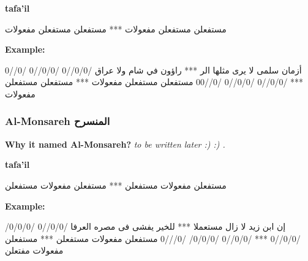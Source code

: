 \textbf{tafa'il}

\begin{Arabic}
  \begin{traditionalpoem*}

مستفعلن مستفعلن مفعولات *** مستفعلن مستفعلن مفعولات 
    
	\end{traditionalpoem*}
      \end{Arabic}


\textbf{Example:}

\begin{Arabic}
  \begin{traditionalpoem*}


    أزمان سلمى لا يرى مثلها الر *** راؤون في شام ولا عراق
/0/0//0 /0/0//0 /0//0 *** /0/0//0 /0/0//0 /0//00
مستفعلن مستفعلن مفعولات *** مستفعلن مستفعلن مفعولات 
        

          
	\end{traditionalpoem*}
      \end{Arabic}


      
      

\subsubsection{Al-Monsareh \textarabic{المنسرح}}
\textbf{Why it named Al-Monsareh?}
\textit{to be written later :) :) .}

\textbf{tafa'il}

\begin{Arabic}
  \begin{traditionalpoem*}

مستفعلن مفعولات مستفعلن *** مستفعلن مفعولات مستفعلن
    
	\end{traditionalpoem*}
      \end{Arabic}


\textbf{Example:}

\begin{Arabic}
  \begin{traditionalpoem*}

    إن ابن زيد لا زال مستعملا *** للخير يفشى فى مصره العرفا
    /0/0//0 /0/0/0/ /0/0//0 *** /0/0//0 /0/0/0/ /0///0
    مستفعلن مفعولات مستفعلن *** مستفعلن مفعولات مفتعلن
    

          
	\end{traditionalpoem*}
      \end{Arabic}


